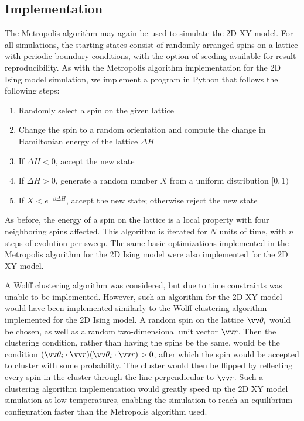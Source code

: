 \documentclass[twocolumn,aps,prl]{revtex4-1} %
\begin{document}
\subsection{Implementation}
The Metropolis algorithm may again be used to simulate the 2D XY model. For all simulations, the starting states consist of randomly arranged spins on a lattice with periodic boundary conditions, with the option of seeding available for result reproducibility. As with the Metropolis algorithm implementation for the 2D Ising model simulation, we implement a program in Python that follows the following steps:
\begin{enumerate}
	\item Randomly select a spin on the given lattice
	\item Change the spin to a random orientation and compute the change in Hamiltonian energy of the lattice $\Delta H$
	\item If $\Delta H < 0$, accept the new state
	\item If $\Delta H > 0$, generate a random number $X$ from a uniform distribution $[0,1)$
	\item If $X < e^{-\beta \Delta H}$, accept the new state; otherwise reject the new state
\end{enumerate}
As before, the energy of a spin on the lattice is a local property with four neighboring spins affected. This algorithm is iterated for $N$ units of time, with $n$ steps of evolution per sweep. The same basic optimizations implemented in the Metropolis algorithm for the 2D Ising model were also implemented for the 2D XY model.

A Wolff clustering algorithm was considered, but due to time constraints was unable to be implemented. However, such an algorithm for the 2D XY model would have been implemented similarly to the Wolff clustering algorithm implemented for the 2D Ising model. A random spin on the lattice $\vv \theta_i$ would be chosen, as well as a random two-dimensional unit vector $\vv r$. Then the clustering condition, rather than having the spins be the same, would be the condition $(\vv \theta_i \cdot \vv r) (\vv \theta_i \cdot \vv r) > 0$, after which the spin would be accepted to cluster with some probability. The cluster would then be flipped by reflecting every spin in the cluster through the line perpendicular to $\vv r$. Such a clustering algorithm implementation would greatly speed up the 2D XY model simulation at low temperatures, enabling the simulation to reach an equilibrium configuration faster than the Metropolis algorithm used. 
\end{document}
